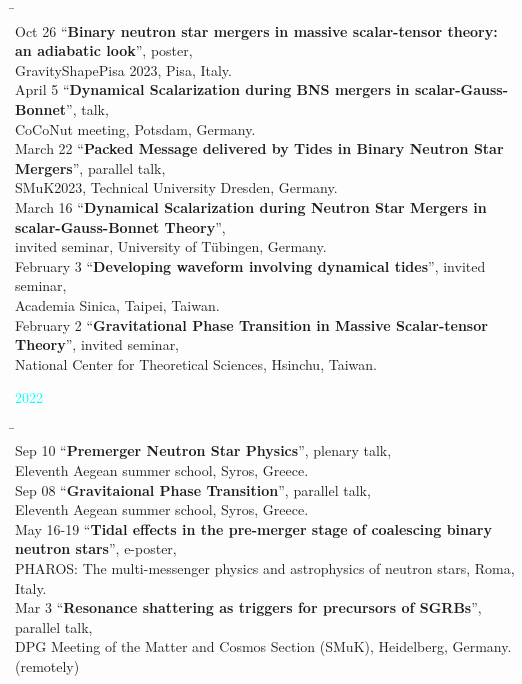 \documentclass[11pt,a4paper,sans]{moderncv}
\begin{document}
\begin{tabbing}
\hspace*{2.3cm} \= \hspace*{10cm} \\[-3ex]
Oct 26 \> ``\textbf{Binary neutron star mergers in massive scalar-tensor theory: an
adiabatic look}'', poster, \\
\> GravityShapePisa 2023, Pisa, Italy.\\
%
April 5 \> ``\textbf{Dynamical Scalarization during BNS mergers
in scalar-Gauss-Bonnet}'', talk, \\
\> CoCoNut meeting, Potsdam, Germany.\\
%
March 22 \> ``\textbf{Packed Message delivered by Tides in
Binary Neutron Star Mergers}'', parallel talk, \\
\> SMuK2023, Technical University Dresden, Germany.\\
%
March 16 \> ``\textbf{Dynamical Scalarization during Neutron Star Mergers in scalar-Gauss-Bonnet Theory}'', \\
\> invited seminar, University of T{\"u}bingen, Germany.\\
%
February 3 \> ``\textbf{Developing waveform involving dynamical tides}'', invited seminar, \\
\> Academia Sinica, Taipei, Taiwan.\\
%
February 2 \> ``\textbf{Gravitational Phase Transition in
Massive Scalar-tensor Theory}'', invited seminar, \\
\> National Center for Theoretical Sciences, Hsinchu, Taiwan.\\
\end{tabbing}

{\Large \textcolor{cyan}{2022}}
\begin{tabbing}
\hspace*{2.3cm} \= \hspace*{10cm} \\[-3ex]
Sep 10 \> ``\textbf{Premerger Neutron Star Physics}'', plenary talk, \\
\> Eleventh Aegean summer school, Syros, Greece.\\
%
Sep 08 \> ``\textbf{Gravitaional Phase Transition}'', parallel talk, \\
\> Eleventh Aegean summer school, Syros, Greece.\\
%
May 16-19 \> ``\textbf{Tidal effects in the pre-merger stage of coalescing binary neutron stars}'', e-poster, \\
\> PHAROS: The multi-messenger physics and astrophysics of neutron stars, Roma, Italy.\\
%
Mar 3 \> ``\textbf{Resonance shattering as triggers for precursors of SGRBs}'', parallel talk, \\
\> DPG Meeting of the Matter and Cosmos Section (SMuK), Heidelberg, Germany. (remotely)
\end{tabbing}
\end{document}

